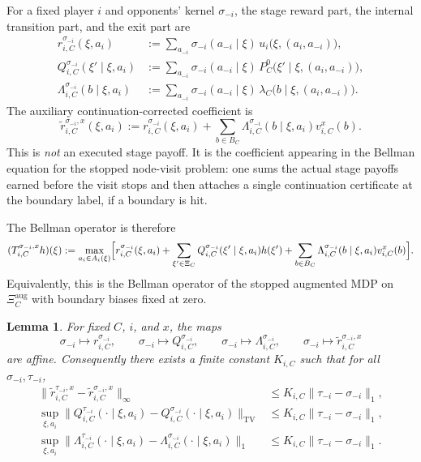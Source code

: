 \documentclass[12pt]{article}
\newtheorem{lemma}[theorem]{Lemma}
\theoremstyle{definition}
\newcommand{\1}{\mathbf{1}}
\begin{document}
For a fixed player $i$ and opponents' kernel $\sigma_{-i}$, the stage reward part,
the internal transition part, and the exit part are
\begin{align}
\label{eq:r-sigma}
r_{i,C}^{\sigma_{-i}}(\xi,a_i)
&:=
\sum_{a_{-i}}\sigma_{-i}(a_{-i}\mid\xi)
\,u_i\bigl(\xi,(a_i,a_{-i})\bigr),
\\
\label{eq:Q-sigma}
Q_{i,C}^{\sigma_{-i}}(\xi'\mid \xi,a_i)
&:=
\sum_{a_{-i}}\sigma_{-i}(a_{-i}\mid\xi)
\,P_C^0\bigl(\xi'\mid\xi,(a_i,a_{-i})\bigr),
\\
\label{eq:q-exit-sigma}
\Lambda_{i,C}^{\sigma_{-i}}(b\mid\xi,a_i)
&:=
\sum_{a_{-i}}\sigma_{-i}(a_{-i}\mid\xi)
\,\lambda_C\bigl(b\mid\xi,(a_i,a_{-i})\bigr).
\end{align}
The auxiliary continuation-corrected coefficient is
\begin{equation}
\label{eq:augmented-reward}
\widetilde r_{i,C}^{\sigma_{-i},x}(\xi,a_i)
:=
r_{i,C}^{\sigma_{-i}}(\xi,a_i)
+
\sum_{b\in B_C}\Lambda_{i,C}^{\sigma_{-i}}(b\mid\xi,a_i)v_{i,C}^x(b).
\end{equation}
This is \emph{not} an executed stage payoff. It is the coefficient appearing in
the Bellman equation for the stopped node-visit problem: one sums the actual
stage payoffs earned before the visit stops and then attaches a single
continuation certificate at the boundary label, if a boundary is hit.

The Bellman operator is therefore
\begin{equation}
\label{eq:Bellman-operator}
(T_{i,C}^{\sigma_{-i},x}h)(\xi)
:=
\max_{a_i\in A_i(\xi)}\Bigl[
 r_{i,C}^{\sigma_{-i}}(\xi,a_i)
 +\sum_{\xi'\in\Xi_C}Q_{i,C}^{\sigma_{-i}}(\xi'\mid\xi,a_i)h(\xi')
 +\sum_{b\in B_C}\Lambda_{i,C}^{\sigma_{-i}}(b\mid\xi,a_i)v_{i,C}^x(b)
 \Bigr].
\end{equation}
Equivalently, this is the Bellman operator of the stopped augmented MDP on
$\Xi_C^{\mathrm{aug}}$ with boundary biases fixed at zero.

\begin{lemma}
\label{lem:coeff-affine}
For fixed $C$, $i$, and $x$, the maps
\[
\sigma_{-i}\mapsto r_{i,C}^{\sigma_{-i}},
\qquad
\sigma_{-i}\mapsto Q_{i,C}^{\sigma_{-i}},
\qquad
\sigma_{-i}\mapsto \Lambda_{i,C}^{\sigma_{-i}},
\qquad
\sigma_{-i}\mapsto \widetilde r_{i,C}^{\sigma_{-i},x}
\]
are affine. Consequently there exists a finite constant $K_{i,C}$ such that for
all $\sigma_{-i},\tau_{-i}$,
\begin{align}
\|\widetilde r_{i,C}^{\tau_{-i},x}-\widetilde r_{i,C}^{\sigma_{-i},x}\|_\infty
&\le K_{i,C}\|\tau_{-i}-\sigma_{-i}\|_1,
\label{eq:r-lip}
\\
\sup_{\xi,a_i}\|Q_{i,C}^{\tau_{-i}}(\cdot\mid\xi,a_i)-Q_{i,C}^{\sigma_{-i}}(\cdot\mid\xi,a_i)\|_{\mathrm{TV}}
&\le K_{i,C}\|\tau_{-i}-\sigma_{-i}\|_1,
\label{eq:Q-lip}
\\
\sup_{\xi,a_i}\|\Lambda_{i,C}^{\tau_{-i}}(\cdot\mid\xi,a_i)-\Lambda_{i,C}^{\sigma_{-i}}(\cdot\mid\xi,a_i)\|_{1}
&\le K_{i,C}\|\tau_{-i}-\sigma_{-i}\|_1.
\label{eq:Lambda-lip}
\end{align}
\end{lemma}
\end{document}
